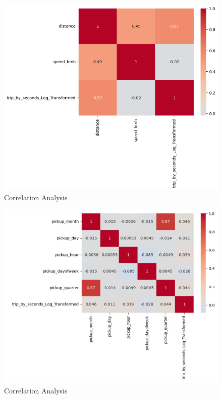\hfill \break
\begin{figure}[ht]
\centering
    \includegraphics[width=1\linewidth]{crr2.png}
    \caption{\label{fig:crr2} Correlation Analysis}
\end{figure}

\begin{figure}
    \centering
    \includegraphics[width=1\linewidth]{corr3.png}
    \caption{Correlation Analysis}
    \label{fig:crr3}
\end{figure}

